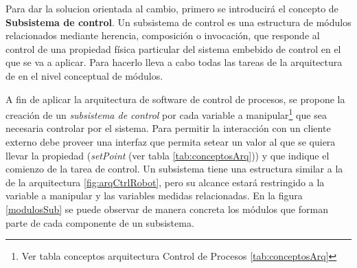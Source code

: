 Para dar la solucion orientada al cambio, primero se introducirá el concepto de \textbf{Subsistema de control}. Un subsistema de control es una estructura de módulos relacionados mediante herencia, composición o invocación, que responde al control de una propiedad física particular del sistema embebido de control en el que se va a aplicar. Para hacerlo lleva a cabo todas las tareas de la arquitectura de  en el nivel conceptual de módulos. 

A fin de aplicar la arquitectura de software de control de procesos, se propone la creación de un \textit{subsistema de control} por cada variable a manipular\footnote{Ver tabla conceptos arquitectura Control de Procesos \ref{tab:conceptosArq}} que sea necesaria controlar por el sistema. Para permitir la interacción con un cliente externo debe proveer una interfaz que permita setear un valor al que se quiera llevar la propiedad (\textit{setPoint} (ver tabla \ref{tab:conceptosArq})) y que indique el comienzo de la tarea de control. Un subsistema tiene una estructura similar a la de la arquitectura \ref{fig:arqCtrlRobot}, pero su alcance estará restringido a la variable a manipular y las variables medidas relacionadas. En la figura \ref{modulosSub} se puede observar de manera concreta los módulos que forman parte de cada componente de un subsistema.


